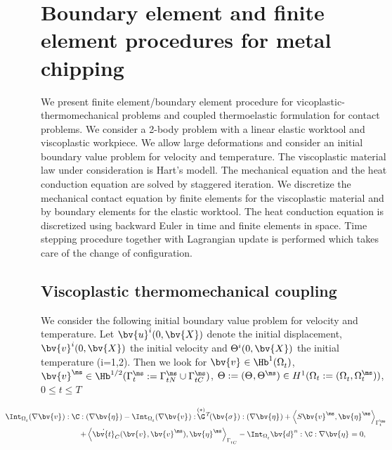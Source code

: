 \section{Boundary element and finite element procedures for metal chipping}\label{sec:FEMBEM_HyperElasto_VP}
We present  finite element/boundary element procedure for  vicoplastic-thermomechanical problems and coupled thermoelastic formulation for contact problems. We consider a 2-body problem with a linear elastic worktool and viscoplastic workpiece. We allow  large deformations and consider an initial boundary value problem for  velocity and temperature. The viscoplastic material law under consideration is Hart's modell. The mechanical equation and the heat conduction equation are solved by staggered iteration. We discretize the mechanical contact equation by finite elements for the viscoplastic material and by boundary elements for the elastic worktool. The heat conduction equation is discretized using backward Euler in time and finite elements in space. Time stepping procedure together with Lagrangian update  is performed which takes care of the change of configuration. 


\subsection{Viscoplastic thermomechanical coupling}
We consider the following initial boundary value problem for  velocity and temperature. Let $\bv{u}^i(0,\bv{X})$ denote the initial displacement, $\bv{v}^{i}(0,\bv{X})$  the initial velocity and $\Theta^i(0,\bv{X})$ the initial temperature (i=1,2). Then we look for $\bv{v}^{\sl}\in\Hb^{1}(\Omega_t^{\sl}) $, $\bv{v}^{\ms} \in\Hb^{1/2}(\Gamma^{\ms}_t:=\Gamma^{\ms}_{tN}\cup\Gamma^{\ms}_{tC})$, $\Theta:=(\Theta^{\sl},\Theta^{\ms})\in H^{1}(\Omega_t:=(\Omega_t^{\sl},\Omega_t^{\ms}))$, $0\leq t \leq T $~

\begin{equation}\label{WeakMech}
\begin{array}{c}
\begin{array}{l}
\displaystyle\hspace{-2.0cm}\Int_{\Omega_t^{\sl}}(\nabla \bv{v}^{\sl}):\C:(\nabla \bv{\eta}^{\sl}) - \Int_{\Omega_t^{\sl}}(\nabla \bv{v}^{\sl}): \,\stackrel{(*)}{\G}\!{}^T\!(\bv{\sigma^{\sl}}):(\nabla \bv{\eta}^{\sl})+\left\langle S \bv{v}^{\ms},\bv{\eta}^{\ms}\right\rangle_{\Gamma^{\ms}_t} 
\end{array}
  \\ [2ex]
\begin{array}{r}
\displaystyle\hspace{0.5cm}+\left\langle\dot{\bv{t}}_{C} (\bv{v}^{\sl},\bv{v}^{\ms}), \bv{\eta}^{\sl \ms}\right\rangle_{\Gamma^{\sl}_{tC}}
-\Int_{\Omega_t^{\sl}} \bv{d}^n : \C : \nabla \bv{\eta}^{\sl} =0,
\end{array}
\end{array}
\end{equation}

